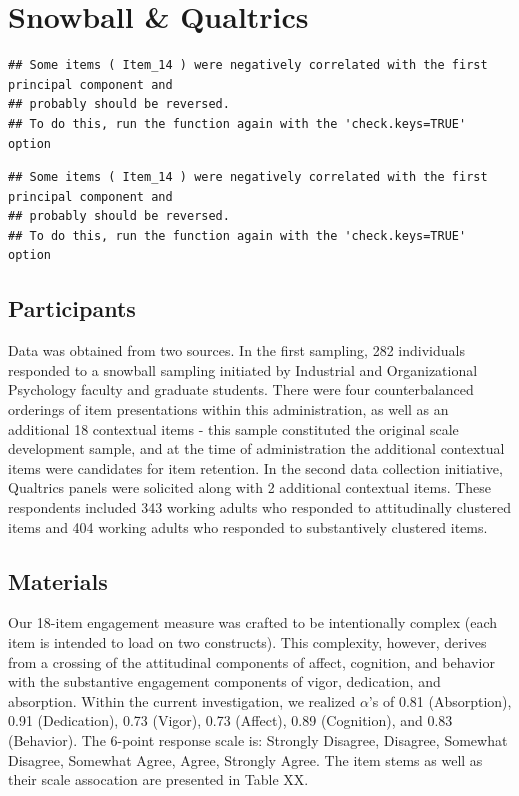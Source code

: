 \documentclass[
  man]{apa6}
\begin{document}
\hypertarget{snowball-qualtrics}{%
\section{Snowball \& Qualtrics}\label{snowball-qualtrics}}

\begin{verbatim}
## Some items ( Item_14 ) were negatively correlated with the first principal component and 
## probably should be reversed.  
## To do this, run the function again with the 'check.keys=TRUE' option
\end{verbatim}

\begin{verbatim}
## Some items ( Item_14 ) were negatively correlated with the first principal component and 
## probably should be reversed.  
## To do this, run the function again with the 'check.keys=TRUE' option
\end{verbatim}

\hypertarget{participants-1}{%
\subsection{Participants}\label{participants-1}}

Data was obtained from two sources. In the first sampling, 282 individuals responded to a snowball sampling initiated by Industrial and Organizational Psychology faculty and graduate students. There were four counterbalanced orderings of item presentations within this administration, as well as an additional 18 contextual items - this sample constituted the original scale development sample, and at the time of administration the additional contextual items were candidates for item retention. In the second data collection initiative, Qualtrics panels were solicited along with 2 additional contextual items. These respondents included 343 working adults who responded to attitudinally clustered items and 404 working adults who responded to substantively clustered items.

\hypertarget{materials}{%
\subsection{Materials}\label{materials}}

Our 18-item engagement measure was crafted to be intentionally complex (each item is intended to load on two constructs). This complexity, however, derives from a crossing of the attitudinal components of affect, cognition, and behavior with the substantive engagement components of vigor, dedication, and absorption. Within the current investigation, we realized \(\alpha\)'s of 0.81 (Absorption), 0.91 (Dedication), 0.73 (Vigor), 0.73 (Affect), 0.89 (Cognition), and 0.83 (Behavior). The 6-point response scale is: Strongly Disagree, Disagree, Somewhat Disagree, Somewhat Agree, Agree, Strongly Agree. The item stems as well as their scale assocation are presented in Table XX.
\end{document}
